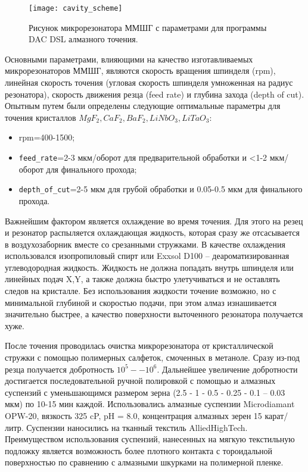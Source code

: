 \begin{figure}[ht]
\centering
  \texttt{[image: cavity\_scheme]}
  \caption{Рисунок микрорезонатора ММШГ с параметрами для программы DAC DSL алмазного точения.}
  \label{cavity_scheme}
\end{figure}

Основными параметрами, влияющими на качество изготавливаемых микрорезонаторов ММШГ, являются скорость вращения шпинделя (rpm), линейная скорость точения (угловая скорость шпинделя умноженная на радиус резонатора), скорость движения резца (feed rate) и глубина захода (depth of cut). Опытным путем были определены следующие оптимальные параметры для точения кристаллов $MgF_2, CaF_2, BaF_2, LiNbO_3, LiTaO_3$:

\begin{itemize}
    \item rpm=400-1500;
    \item \texttt{feed\_rate}=2-3 мкм/оборот для предварительной обработки и <1-2 мкм/оборот для финального прохода;
    \item \texttt{depth\_of\_cut}=2-5 мкм для грубой обработки и 0.05-0.5 мкм для финального прохода.
\end{itemize}

Важнейшим фактором является охлаждение во время точения. Для этого на резец и резонатор распыляется охлаждающая жидкость, которая сразу же отсасывается в воздухозаборник вместе со срезанными стружками. В качестве охлаждения использовался изопропиловый спирт или Exxsol D100 – деароматизированная углеводородная жидкость. Жидкость не должна попадать внутрь шпинделя или линейных подач X,Y, а также должна быстро улетучиваться и не оставлять следов на кристалле. Без использования жидкости точение возможно, но с минимальной глубиной и скоростью подачи, при этом алмаз изнашивается значительно быстрее, а качество поверхности выточенного резонатора получается хуже.

После точения проводилась очистка микрорезонатора от кристаллической стружки с помощью полимерных салфеток, смоченных в метаноле. Сразу из-под резца получается добротность $10^5 -- 10^6$. Дальнейшее увеличение добротности достигается последовательной ручной полировкой с помощью и алмазных суспензий с уменьшающимся размером зерна (2.5 - 1 - 0.5 - 0.25 - 0.1 – 0.03 мкм) по 10-15 мин каждой. Использовались алмазные суспензии Microdiamant OPW-20, вязкость 325 cP, pH = 8.0, концентрация алмазных зерен 15 карат/литр. Суспензии наносились на тканный текстиль AlliedHighTech. Преимуществом использования суспензий, нанесенных на мягкую текстильную подложку является возможность более плотного контакта с тороидальной поверхностью по сравнению с алмазными шкурками на полимерной пленке.


